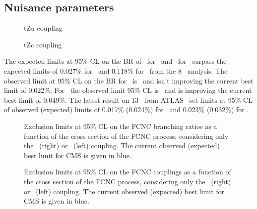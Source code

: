\subsection{Nuisance parameters}
\begin{figure}[h] 
	\centering
	\caption{tZu coupling}
	\label{fig:impacts170901zutnomcc}
\end{figure}
\begin{figure}[h] 
	\centering
	\caption{tZc coupling}
	\label{fig:impacts170901zctnomcc}
\end{figure}
The expected limits at 95\% CL on the BR of \BRZut\ for \Zut\ and \BRZct\ for \Zct\ surpass the expected limits of 0.027\% for \Zut\ and 0.118\% for \Zct\ from the 8 \TeV\ analysis. The observed limit at 95\% CL on the BR for \Zut\ is \BRZutobs\ and isn't improving the current best limit of 0.022\%. For \Zct\ the observed limit 95\% CL is \BRZctobs\ and is improving the current best limit of 0.049\%.  The latest result on 13 \TeV\ from ATLAS~\cite{ATLAS-CONF-2017-070} set limits at 95\% CL of 
observed (expected) limits of 0.017\% (0.024\%) for \Zut\ and 0.023\% (0.032\%) for \Zct. 
\begin{figure}[ht]
	\centering
	\caption{Exclusion limits at 95\% CL on the FCNC branching ratios as a function of the cross section of the FCNC process,  considering only the \Zct\ (right) or \Zut\ (left) coupling. The current observed (expected) best limit for CMS is given in blue.}
	\label{fig:exclusionlimitbr}
\end{figure}
\begin{figure}[ht]
	\centering
	\caption{Exclusion limits at 95\% CL on the FCNC couplings as a function of the cross section of the FCNC process,  considering only the \Zct\ (right) or \Zut\ (left) coupling. The current observed (expected) best limit for CMS is given in blue.}
	\label{fig:exclusionlimitbrc}
\end{figure}

